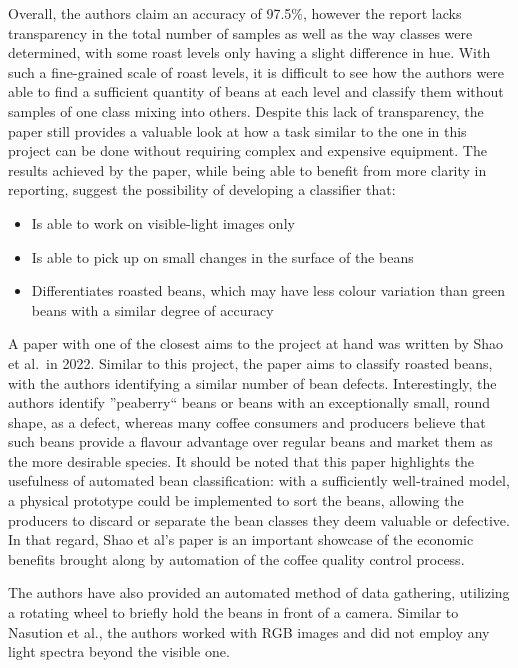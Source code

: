 Overall, the authors claim an accuracy of 97.5\%, however the report lacks
transparency in the total number of samples as well as the way classes were
determined, with some roast levels only having a slight difference in hue.
With
such a fine-grained scale of roast levels, it is difficult to see how the authors
were able to find a sufficient quantity of beans at each level and classify them
without samples of one class mixing into others.
Despite this lack of
transparency, the paper still provides a valuable look at how a task similar to the
one in this project can be done without requiring complex and expensive equipment.
The results achieved by the paper, while being able to benefit from more clarity
in reporting, suggest the possibility of developing a classifier that:
\begin{itemize}
	\item Is able to work on visible-light images only

	\item Is able to pick up on small changes in the surface of the beans

	\item Differentiates roasted beans, which may have less colour variation than
	green beans with a similar degree of accuracy
\end{itemize}

A paper with one of the closest aims to the project at hand was written by Shao et al.\ in
2022\cite{rgbDeepLearningShao}.
Similar to this project, the paper aims to
classify roasted beans, with the authors identifying a similar number of bean defects.
Interestingly, the authors identify ''peaberry`` beans or beans with an exceptionally
small, round shape, as a defect,
whereas many coffee consumers and producers believe that such beans provide a
flavour advantage over regular beans and market them as the more desirable
species.
It should be noted that this paper highlights the usefulness of automated
bean classification: with a sufficiently well-trained model, a physical prototype
could be implemented to sort the beans, allowing the producers to discard or
separate the bean classes they deem valuable or defective.
In that regard, Shao
et al's paper is an important showcase of the economic benefits brought along by
automation of the coffee quality control process.

The authors have also provided an automated method of data gathering, utilizing a
rotating wheel to briefly hold the beans in front of a camera.
Similar to
Nasution et al.\cite{manyRoastLevelsNasution}, the authors worked with RGB images
and did not employ any light spectra beyond the visible one.

